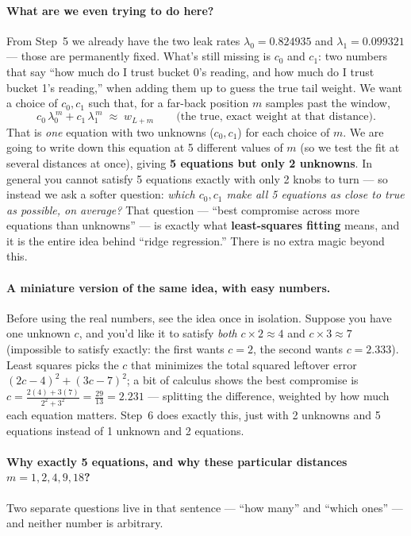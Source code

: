 \documentclass[11pt]{article}
\begin{document}
\paragraph{What are we even trying to do here?}
From Step~5 we already have the two leak rates $\lambda_0=0.824935$ and $\lambda_1=0.099321$ --- those are permanently fixed. What's still missing is $c_0$ and $c_1$: two numbers that say ``how much do I trust bucket 0's reading, and how much do I trust bucket 1's reading,'' when adding them up to guess the true tail weight. We want a choice of $c_0,c_1$ such that, for a far-back position $m$ samples past the window,
\[
c_0\,\lambda_0^{\,m} + c_1\,\lambda_1^{\,m} \;\approx\; w_{L+m} \qquad \text{(the true, exact weight at that distance)}.
\]
That is \emph{one} equation with two unknowns ($c_0,c_1$) for each choice of $m$. We are going to write down this equation at 5 different values of $m$ (so we test the fit at several distances at once), giving \textbf{5 equations but only 2 unknowns}. In general you cannot satisfy 5 equations exactly with only 2 knobs to turn --- so instead we ask a softer question: \emph{which $c_0,c_1$ make all 5 equations as close to true as possible, on average?} That question --- ``best compromise across more equations than unknowns'' --- is exactly what \textbf{least-squares fitting} means, and it is the entire idea behind ``ridge regression.'' There is no extra magic beyond this.

\paragraph{A miniature version of the same idea, with easy numbers.}
Before using the real numbers, see the idea once in isolation. Suppose you have one unknown $c$, and you'd like it to satisfy \emph{both} $c\times2\approx4$ and $c\times3\approx 7$ (impossible to satisfy exactly: the first wants $c=2$, the second wants $c=2.333$). Least squares picks the $c$ that minimizes the total squared leftover error $(2c-4)^2+(3c-7)^2$; a bit of calculus shows the best compromise is $c=\frac{2(4)+3(7)}{2^2+3^2}=\frac{29}{13}=2.231$ --- splitting the difference, weighted by how much each equation matters. Step~6 does exactly this, just with 2 unknowns and 5 equations instead of 1 unknown and 2 equations.

\paragraph{Why exactly 5 equations, and why these particular distances $m=1,2,4,9,18$?}
Two separate questions live in that sentence --- ``how many'' and ``which ones'' --- and neither number is arbitrary.
\end{document}
